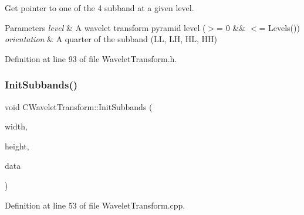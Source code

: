 Get pointer to one of the 4 subband at a given level. 
\begin{DoxyParams}{Parameters}
{\em level} & A wavelet transform pyramid level ($>$= 0 \&\& $<$= Levels()) \\
\hline
{\em orientation} & A quarter of the subband (LL, LH, HL, HH) \\
\hline
\end{DoxyParams}


Definition at line 93 of file Wavelet\+Transform.\+h.


\begin{DoxyCode}{0}

\end{DoxyCode}
\mbox{\label{classCWaveletTransform_a4d03868a4bb8688235d41d6b1d7a97de}} 
\subsubsection{\texorpdfstring{InitSubbands()}{InitSubbands()}}
{\footnotesize\ttfamily void C\+Wavelet\+Transform\+::\+Init\+Subbands (\begin{DoxyParamCaption}\item[{U\+I\+N\+T32}]{width,  }\item[{U\+I\+N\+T32}]{height,  }\item[{\mbox{\hyperlink{PGFtypes_8h_acb1ee3f52ccfad782dcaa0abd79e5d05}{DataT}} $\ast$}]{data }\end{DoxyParamCaption})\hspace{0.3cm}{\ttfamily [private]}}



Definition at line 53 of file Wavelet\+Transform.\+cpp.


